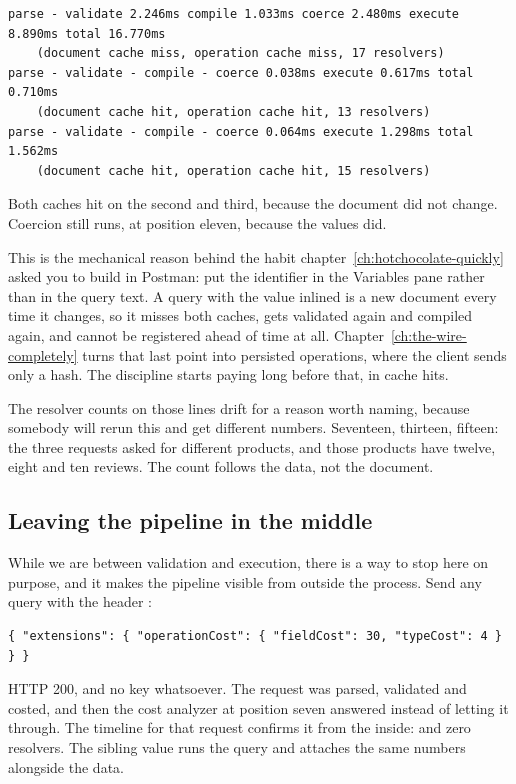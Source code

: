 \begin{verbatim}
parse - validate 2.246ms compile 1.033ms coerce 2.480ms execute 8.890ms total 16.770ms
    (document cache miss, operation cache miss, 17 resolvers)
parse - validate - compile - coerce 0.038ms execute 0.617ms total 0.710ms
    (document cache hit, operation cache hit, 13 resolvers)
parse - validate - compile - coerce 0.064ms execute 1.298ms total 1.562ms
    (document cache hit, operation cache hit, 15 resolvers)
\end{verbatim}

Both caches hit on the second and third, because the document did not change.
Coercion still runs, at position eleven, because the values did.

%
This is the mechanical reason behind the habit
chapter~\ref{ch:hotchocolate-quickly} asked you to build in Postman: put the
identifier in the Variables pane rather than in the query text. A query with the
value inlined is a new document every time it changes, so it misses both caches,
gets validated again and compiled again, and cannot be registered ahead of time
at all. Chapter~\ref{ch:the-wire-completely} turns that last point into
persisted operations, where the client sends only a hash. The discipline starts
paying long before that, in cache hits.

%
The resolver counts on those lines drift for a reason worth naming, because
somebody will rerun this and get different numbers. Seventeen, thirteen,
fifteen: the three requests asked for different products, and those products
have twelve, eight and ten reviews. The count follows the data, not the
document.

\subsection*{Leaving the pipeline in the middle}

%
While we are between validation and execution, there is a way to stop here on
purpose, and it makes the pipeline visible from outside the process. Send any
query with the header :

\begin{verbatim}
{ "extensions": { "operationCost": { "fieldCost": 30, "typeCost": 4 } } }
\end{verbatim}

HTTP 200, and no  key whatsoever. The request was parsed, validated
and costed, and then the cost analyzer at position seven answered instead of
letting it through. The timeline for that request confirms it from the inside:
 and zero resolvers. The sibling value  runs the
query and attaches the same numbers alongside the data.


